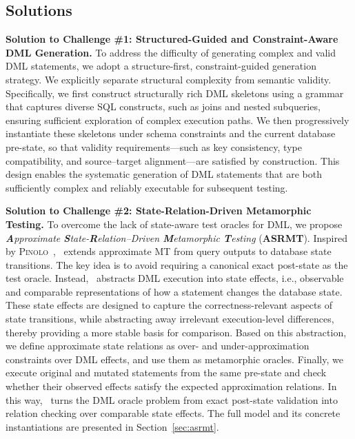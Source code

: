 \vspace{-2.5mm}
\subsection{Solutions}

\textbf{Solution to Challenge \#1: Structured-Guided and Constraint-Aware DML Generation.}
To address the difficulty of generating complex and valid DML statements, we adopt a structure-first, constraint-guided generation strategy.
We explicitly separate structural complexity from semantic validity.
Specifically, we first construct structurally rich DML skeletons using a grammar that captures diverse SQL constructs, such as joins and nested subqueries, ensuring sufficient exploration of complex execution paths.
We then progressively instantiate these skeletons under schema constraints and the current database pre-state, so that validity requirements—such as key consistency, type compatibility, and source--target alignment—are satisfied by construction.
This design enables the systematic generation of DML statements that are both sufficiently complex and reliably executable for subsequent testing.


\textbf{Solution to Challenge \#2: State-Relation-Driven Metamorphic Testing.}
To overcome the lack of state-aware test oracles for DML, we propose \textit{\textbf{A}pproximate \textbf{S}tate-\textbf{R}elation–Driven \textbf{M}etamorphic \textbf{T}esting} (\textbf{ASRMT}).
Inspired by \textsc{Pinolo}~\cite{hao2023pinolo}, \model\ extends approximate MT from query outputs to database state transitions.
The key idea is to avoid requiring a canonical exact post-state as the test oracle. 
Instead, \model\ abstracts DML execution into state effects, i.e., observable and comparable representations of how a statement changes the database state.
These state effects are designed to capture the correctness-relevant aspects of state transitions, while abstracting away irrelevant execution-level differences, thereby providing a more stable basis for comparison.
Based on this abstraction, we define approximate state relations as over- and under-approximation constraints over DML effects, and use them as metamorphic oracles.
Finally, we execute original and mutated statements from the same pre-state and check whether their observed effects satisfy the expected approximation relations.
In this way, \model\ turns the DML oracle problem from exact post-state validation into relation checking over comparable state effects.
The full model and its concrete instantiations are presented in Section~\ref{sec:asrmt}.

